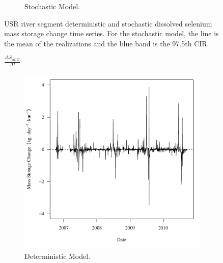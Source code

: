 \begin{landscape}
\begin{figure}
\begin{subfigure}{0.7\textwidth}
			\caption{Stochastic Model.}
		\end{subfigure}
		\caption[USR river segment deterministic and stochastic dissolved selenium mass storage change time series.]{USR river segment deterministic and stochastic dissolved selenium mass storage change time series.  For the stochastic model, the line is the mean of the realizations and the blue band is the 97.5th CIR.}
		\label{fig:massSegmentStoreChange_DSR}
	\end{figure}
\end{landscape}

\subfiguremid
\begin{landscape}
	\begin{figure}
		$ \displaystyle \frac{\Delta S_{M,G}}{\Delta t} $
		\begin{subfigure}{0.7\textwidth}
			\centering
			\includegraphics[width=\tableCustomSize]{"Figures/Results_DSR/Deterministic/f Segment G"}
			\caption{Deterministic Model.}
		\end{subfigure}%
		\begin{subfigure}{0.7\textwidth}
			\centering

\end{subfigure}
\end{figure}
\end{landscape}
